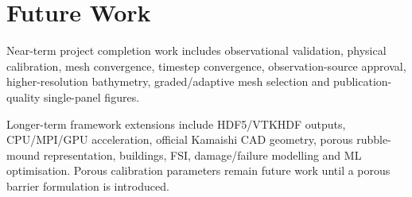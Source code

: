 \section{Future Work}

Near-term project completion work includes observational validation, physical calibration, mesh convergence, timestep convergence, observation-source approval, higher-resolution bathymetry, graded/adaptive mesh selection and publication-quality single-panel figures.

Longer-term framework extensions include HDF5/VTKHDF outputs, CPU/MPI/GPU acceleration, official Kamaishi CAD geometry, porous rubble-mound representation, buildings, FSI, damage/failure modelling and ML optimisation. Porous calibration parameters remain future work until a porous barrier formulation is introduced.

